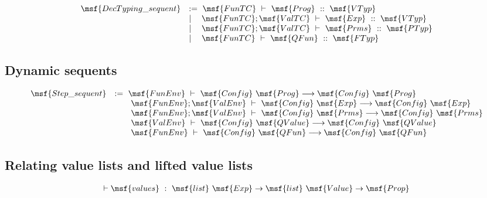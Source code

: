 \documentclass{article}
\begin{document}
\begin{gather}
  \begin{array}{lll}
 \msf{DecTyping\_sequent} & := 
%
\ \msf{FunTC} \ \vdash \ \msf{Prog} \ :: \ \msf{VTyp} \\
%
& \mid \quad \msf{FunTC}; \msf{ValTC} \ \vdash \ \msf{Exp} \ ::
\ \msf{VTyp} \\
%
 & \mid \quad \msf{FunTC}; \msf{ValTC} \ \vdash \ \msf{Prms} \ ::
 \ \msf{PTyp} \\
%
& \mid \quad \msf{FunTC} \ \vdash \ \msf{QFun} \ :: \ \msf{FTyp} 
\end{array}
\end{gather}  



\subsection{Dynamic sequents}


\begin{gather}
 \begin{array}{lll}
   \msf{Step\_sequent} & := \
   \msf{FunEnv} \ \vdash \ \msf{Config} \ \msf{Prog}
 \longrightarrow \msf{Config} \ \msf{Prog} \\
 & \quad \quad \msf{FunEnv}; \msf{ValEnv} \ \vdash \ \msf{Config} \ \msf{Exp}
 \longrightarrow \msf{Config} \ \msf{Exp} \\
 & \quad \quad \msf{FunEnv}; \msf{ValEnv} \ \vdash \ \msf{Config} \ \msf{Prms}
 \longrightarrow \msf{Config} \ \msf{Prms} \\
 & \quad \quad \msf{ValEnv} \ \vdash \ \msf{Config} \ \msf{QValue}
 \longrightarrow \msf{Config} \ \msf{QValue} \\
%
 & \quad \quad \msf{FunEnv} \ \vdash \ \msf{Config} \ \msf{QFun}
 \longrightarrow \msf{Config} \ \msf{QFun}
\end{array}
\end{gather}  





\subsection{Relating value lists and lifted value lists}

\begin{gather}
\vdash \msf{values} \ : \ \msf{list} \ \msf{Exp} \to \msf{list}
\ \msf{Value} \to \msf{Prop}
\end{gather}
\end{document}
